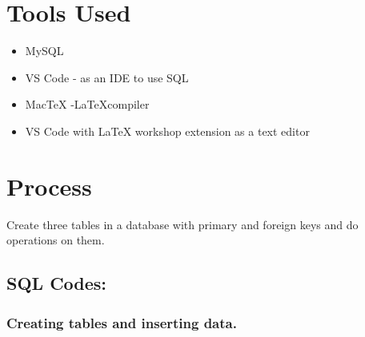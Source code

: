 \documentclass[12pt]{article}
\title{}
\author{}
\date{}
\begin{document}

\pagebreak

\tableofcontents

\maketitle

\section{Tools Used}
\begin{itemize}
    \item MySQL
    \item VS Code - as an IDE to use SQL
    \item MacTeX -\LaTeX  compiler
    \item VS Code with LaTeX workshop extension as a text editor
\end{itemize}


\section{Process}
Create three tables in a database with primary and foreign keys and do operations on them.

\subsection*{SQL Codes:}

\subsubsection*{Creating tables and inserting data.}
\end{document}
